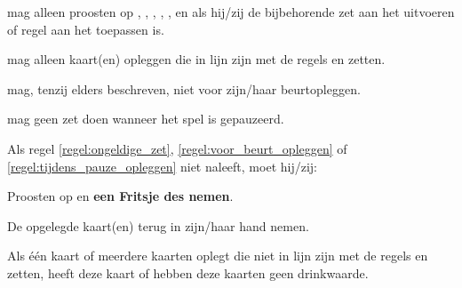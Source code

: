 
\vervolgLijst{}
    \item \EenSpeler mag alleen proosten op , , , , ,  en  als hij/zij de bijbehorende zet aan het uitvoeren of regel aan het toepassen is\footnotemark[2]. 
\eindLijst{}


\vervolgLijst{}
    \item \EenSpeler mag alleen kaart(en) opleggen die in lijn zijn met de regels en zetten.
    \label{regel:ongeldige_zet}
\eindLijst{}

\vervolgLijst{}
    \item \EenSpeler mag, tenzij elders beschreven, niet voor zijn/haar beurt\footnotemark[3] opleggen.
    \label{regel:voor_beurt_opleggen}
\eindLijst{}

\vervolgLijst{}
    \item \EenSpeler mag geen zet doen wanneer het spel is gepauzeerd\footnotemark[4].
    \label{regel:tijdens_pauze_opleggen}
\eindLijst{}

\vervolgLijst{}
    \item Als \eenSpeler regel \ref{regel:ongeldige_zet}, \ref{regel:voor_beurt_opleggen} of \ref{regel:tijdens_pauze_opleggen} niet naleeft, moet hij/zij:
    \puntLijst{}
        \item Proosten op  en \textbf{een Fritsje des nemen}\footnotemark[1].
        \item De opgelegde kaart(en) terug in zijn/haar hand nemen.
    \eindPuntLijst{}
    \label{regel:kaarten_terugnemen_2}
\eindLijst{}

\vervolgLijst{}
    \item Als \eenSpeler één kaart of meerdere kaarten oplegt die niet in lijn zijn met de regels en zetten, heeft deze kaart of hebben deze kaarten geen drinkwaarde.
\eindLijst{}  


